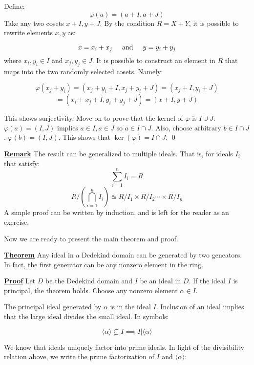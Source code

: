 \documentclass{article}
\newcommand{\new}[1]{
    \vspace{2mm}
    \noindent
    \textbf{
    \underline{#1}}
}
\newcommand{\textAnd}{
    \hspace{5mm}
    \textrm{and}
    \hspace{5mm}
}
\newcommand{\<}{{{
    \langle
}}}
\def\>{{{
    \rangle
}}}
\begin{document}
    Define:
    \[
        \varphi(a) = (a + I, a + J)
    \]
    Take any two cosets $x + I, y + J$. By the condition 
    $R = X + Y$, it is possible to rewrite elements $x, y$ as:
    
    \[
        x = x_i + x_j \textAnd y = y_i + y_j
    \]
    where $x_i, y_i \in I$ and $x_j, y_j \in J$.
    It is possible to construct an element in $R$ that 
    maps into the two randomly selected cosets. Namely:

    \[
        \varphi(x_j + y_i) = (x_j + y_i + I,x_j + y_i + J)
        =(x_j + I, y_i + J) \]\[= (x_i + x_j + I, y_i + y_j + J) 
        = (x + I, y + J)        
    \]

    This shows surjectivity. Move on to prove that the kernel 
    of $\varphi$
    is $I \cup J$. $\varphi(a) = (I, J)$ implies 
    $a \in I, a \in J$ so $a \in I \cap J$. Also, 
    choose arbitrary $b \in I \cap J$. $\varphi(b) = (I, J)$. 
    This shows that $\ker(\varphi) = I\cap J$. \qed

    \new{Remark} The result can be generalized to multiple ideals. 
    That is, for ideals $I_i$ that satisfy:
    \[
        \sum_{i = 1}^n I_i = R 
    \]
    \[
        R/(\bigcap_{i = 1}^n I_i) \approxeq R / I_1 \times R/I_2 \cdots \times R/I_n
    \]
    A simple proof can be written by induction, and is left 
    for the reader as an exercise. 

    \vspace{5mm}

    Now we are ready to present the main theorem and proof. 

    \new{Theorem} Any ideal in a Dedekind domain can 
    be generated by two geneators. In fact, the first generator 
    can be any nonzero element in the ring. 

    \new{Proof} Let $D$ be the Dedekind domain and $I$ be an 
    ideal in $D$. If the ideal $I$ is principal, the theorem holds. 
    Choose any nonzero element $\alpha \in I$. 

    The principal ideal generated by $\alpha$ is in the ideal $I$. 
    Inclusion of an ideal implies that the large ideal divides the 
    small ideal. In symbols:

    \[
        \<\alpha\> \subsetneq I
        \implies 
        I | \<\alpha\>
    \]
    
    We know that 
    ideals uniquely factor into prime ideals. In light 
    of the divisibility relation above, we write 
    the prime factorization of $I$ and $\<\alpha\>$:
\end{document}
